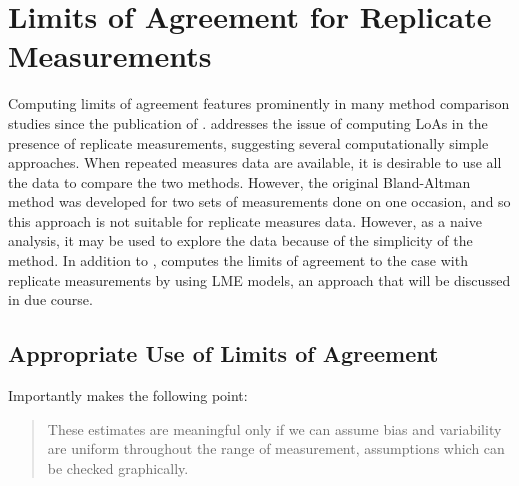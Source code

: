 \documentclass[12pt, a4paper]{report}
\theoremstyle{plain}
\theoremstyle{definition}
\theoremstyle{remark}
\begin{document}
	
\section{Limits of Agreement for Replicate Measurements}

Computing limits of agreement features prominently in many method comparison studies since the publication of \citet{BA86}.
\citet{BA99} addresses the issue of computing LoAs in the presence of replicate measurements, suggesting several computationally simple approaches. When repeated measures data are available, it is desirable to use
all the data to compare the two methods. However, the original Bland-Altman method was developed for two sets of measurements done on one occasion, and so this approach is not suitable for replicate measures data. However, as a naive analysis, it may be used to explore the data because of the simplicity of the method.
In addition to \citet{BA99}, \citet{BXC2008} computes the limits of agreement to the case with replicate measurements by using LME models, an approach that will be discussed in due course.


\subsection{Appropriate Use of Limits of Agreement}
Importantly \citet{BA99} makes the following point:
\begin{quote}These estimates are meaningful only if we can assume
	bias and variability are uniform throughout the range of
	measurement, assumptions which can be checked graphically.
\end{quote}
\end{document}
